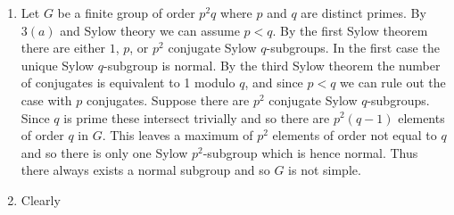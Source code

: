 \documentclass[a4paper, 12pt]{article}
\begin{document}
\begin{enumerate}
\begin{enumerate}
\end{enumerate}

\item Let \(G\) be a finite group of order \(p^2q\) where \(p\) and \(q\) are distinct primes. By \(3(a)\) and Sylow theory we can assume \(p<q\). By the first Sylow theorem there are either \(1\), \(p\), or \(p^2\) conjugate Sylow \(q\)-subgroups. In the first case the unique Sylow \(q\)-subgroup is normal. By the third Sylow theorem the number of conjugates is equivalent to 1 modulo \(q\), and since \(p<q\) we can rule out the case with \(p\) conjugates. Suppose there are \(p^2\) conjugate Sylow \(q\)-subgroups. Since \(q\) is prime these intersect trivially and so there are \(p^2(q-1)\) elements of order \(q\) in \(G\). This leaves a maximum of \(p^2\) elements of order not equal to \(q\) and so there is only one Sylow \(p^2\)-subgroup which is hence normal. Thus there always exists a normal subgroup and so \(G\) is not simple.

\item Clearly

\end{enumerate}
\end{document}
